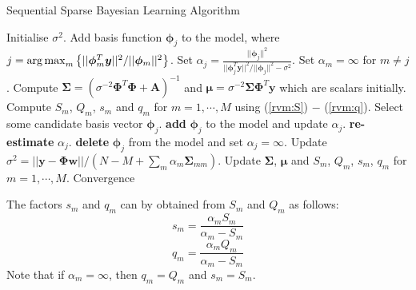 \begin{algorithm}
  \caption{Sequential Sparse Bayesian Learning Algorithm \cite{tipping2003}}
  \label{rvm:alg2}
  \begin{algorithmic}[1]
    \State Initialise $\sigma^2$.\label{rvm:initSig}
    \State Add basis function $\bm\phi_j$ to the model, where $j = \operatorname*{arg\,max}_m \left\{||\bm\phi_m^T\bm y||^2/||\bm\phi_m||^2\right\}$.\label{rvm:initPhi}
    \Statex Set $\alpha_j = \frac{||\bm\phi_j||^2}{||\bm\phi_j^T\bm y||^2/||\bm\phi_j||^2 - \sigma^2}$. Set $\alpha_m = \infty$ for $m\neq j$.
    \State Compute $\bm\Sigma = \left(\sigma^{-2}\bm\Phi^T\bm\Phi + \bm A\right)^{-1}$ and $\bm\mu = \sigma^{-2}\bm\Sigma\bm\Phi^T\bm y$ which are scalars initially.\label{rvm:fullStats}
    \Statex Compute $S_m$, $Q_m$, $s_m$ and $q_m$ for $m = 1,\cdots,M$ using (\ref{rvm:S}) $-$ (\ref{rvm:q}). %
    \Repeat\label{rvm:bigLoop}
    \State Select some candidate basis vector $\bm\phi_j$.\label{rvm:select}
     \textbf{add} $\bm\phi_j$ to the model and update $\alpha_j$. \EndIIf\label{rvm:add}
     \textbf{re-estimate} $\alpha_j$. \EndIIf\label{rvm:reestimate}
     \textbf{delete} $\bm\phi_j$ from the model and set $\alpha_j=\infty$. \EndIIf\label{rvm:delete}
    \State Update $\sigma^2 = ||\bm y - \bm\Phi\bm w||/(N-M+\sum_m\alpha_m\bm\Sigma_{mm})$\label{rvm:noise}\cite{tipping2001}.
    \State Update $\bm\Sigma$, $\bm\mu$ and $S_m$, $Q_m$, $s_m$, $q_m$ for $m = 1,\cdots, M$.\label{rvm:update}
    \Until Convergence
  \end{algorithmic}
\end{algorithm}

The factors $s_m$ and $q_m$ can by obtained from $S_m$ and $Q_m$ as follows:
\begin{equation}
  \label{rvm:s}
  s_m = \frac{\alpha_m S_m}{\alpha_m - S_m}
\end{equation}
\begin{equation}
  \label{rvm:q}
  q_m = \frac{\alpha_m Q_m}{\alpha_m - S_m}
\end{equation}
Note that if $\alpha_m = \infty$, then $q_m = Q_m$ and $s_m = S_m$.


